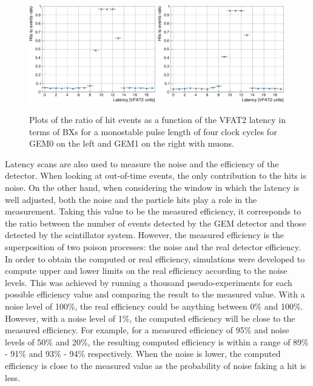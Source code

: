       \begin{figure}[h!]
        \centering
        \includegraphics[width=0.49\textwidth]{img/plots/cLatency_GEM0-crop}
        \includegraphics[width=0.49\textwidth]{img/plots/cLatency_GEM1-crop}
        \caption{Plots of the ratio of hit events as a function of the VFAT2 latency in terms of BXs for a monostable pulse length of four clock cycles for GEM0 on the left and GEM1 on the right with muons.}
        \label{fig:II-3-data-latency}
      \end{figure}

      Latency scans are also used to measure the noise and the efficiency of the detector. When looking at out-of-time events, the only contribution to the hits is noise. On the other hand, when considering the window in which the latency is well adjusted, both the noise and the particle hits play a role in the measurement. Taking this value to be the measured efficiency, it corresponds to the ratio between the number of events detected by the GEM detector and those detected by the scintillator system. However, the measured efficiency is the superposition of two poison processes: the noise and the real detector efficiency. In order to obtain the computed or real efficiency, simulations were developed to compute upper and lower limits on the real efficiency according to the noise levels. This was achieved by running a thousand pseudo-experiments for each possible efficiency value and comparing the result to the measured value. With a noise level of 100\%, the real efficiency could be anything between 0\% and 100\%. However, with a noise level of 1\%, the computed efficiency will be close to the measured efficiency. For example, for a measured efficiency of 95\% and noise levels of 50\% and 20\%, the resulting computed efficiency is within a range of 89\% - 91\% and 93\% - 94\% respectively. When the noise is lower, the computed efficiency is close to the measured value as the probability of noise faking a hit is less.

